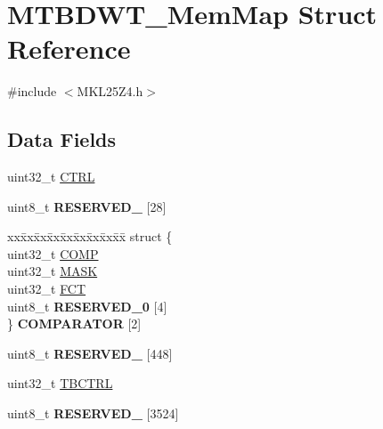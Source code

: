 \hypertarget{struct_m_t_b_d_w_t___mem_map}{}\section{M\+T\+B\+D\+W\+T\+\_\+\+Mem\+Map Struct Reference}
\label{struct_m_t_b_d_w_t___mem_map}


{\ttfamily \#include $<$M\+K\+L25\+Z4.\+h$>$}

\subsection*{Data Fields}
\begin{DoxyCompactItemize}
\item 
uint32\+\_\+t \hyperlink{struct_m_t_b_d_w_t___mem_map_a3be6514ca3bd369fd0de9f8f49471179}{C\+T\+R\+L}
\item 
\hypertarget{struct_m_t_b_d_w_t___mem_map_ac8c74521f9046fb165e5340648fde167}{}uint8\+\_\+t {\bfseries R\+E\+S\+E\+R\+V\+E\+D\+\_} \mbox{[}28\mbox{]}\label{struct_m_t_b_d_w_t___mem_map_ac8c74521f9046fb165e5340648fde167}

\item 
\hypertarget{struct_m_t_b_d_w_t___mem_map_acc1998ad108efcea86b449353341cd86}{}\begin{tabbing}
xx\=xx\=xx\=xx\=xx\=xx\=xx\=xx\=xx\=\kill
struct \{\\
\>uint32\_t \hyperlink{struct_m_t_b_d_w_t___mem_map_aa1352530035b6609791c19fda0cc2fb6}{COMP}\\
\>uint32\_t \hyperlink{struct_m_t_b_d_w_t___mem_map_a33f6052ebf71e72af18f19c6edadafc4}{MASK}\\
\>uint32\_t \hyperlink{struct_m_t_b_d_w_t___mem_map_a46e8a27d0191f1241050aeb47264ff8f}{FCT}\\
\>uint8\_t {\bfseries RESERVED\_0} \mbox{[}4\mbox{]}\\
\} {\bfseries COMPARATOR} \mbox{[}2\mbox{]}\label{struct_m_t_b_d_w_t___mem_map_acc1998ad108efcea86b449353341cd86}
\\

\end{tabbing}\item 
\hypertarget{struct_m_t_b_d_w_t___mem_map_a58f4945ef26d5e7445535c45a4b9a41c}{}uint8\+\_\+t {\bfseries R\+E\+S\+E\+R\+V\+E\+D\+\_} \mbox{[}448\mbox{]}\label{struct_m_t_b_d_w_t___mem_map_a58f4945ef26d5e7445535c45a4b9a41c}

\item 
uint32\+\_\+t \hyperlink{struct_m_t_b_d_w_t___mem_map_a6efc9cce972933a09ad4baee83a38ac3}{T\+B\+C\+T\+R\+L}
\item 
\hypertarget{struct_m_t_b_d_w_t___mem_map_ab94602d1d19ef947e697256be9e503ea}{}uint8\+\_\+t {\bfseries R\+E\+S\+E\+R\+V\+E\+D\+\_} \mbox{[}3524\mbox{]}\label{struct_m_t_b_d_w_t___mem_map_ab94602d1d19ef947e697256be9e503ea}


\end{DoxyCompactItemize}
